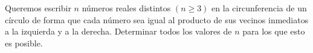Queremos escribir $n$ números reales distintos $(n\geq 3)$ en la circunferencia de un círculo de forma que cada número sea igual al producto de sus vecinos inmediatos a la izquierda y a la derecha. Determinar todos los valores de $n$ para los que esto es posible.

